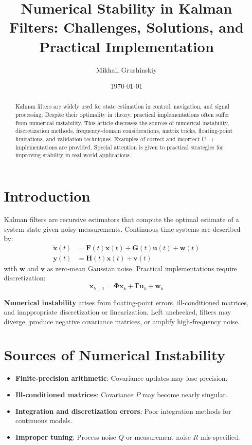 \documentclass[11pt]{article}
\title{Numerical Stability in Kalman Filters: Challenges, Solutions, and Practical Implementation}
\author{Mikhail Grushinskiy}
\date{\today}
\begin{document}
\maketitle

\begin{abstract}
Kalman filters are widely used for state estimation in control, navigation, and signal processing. Despite their optimality in theory, practical implementations often suffer from numerical instability. This article discusses the sources of numerical instability, discretization methods, frequency-domain considerations, matrix tricks, floating-point limitations, and validation techniques. Examples of correct and incorrect C++ implementations are provided. Special attention is given to practical strategies for improving stability in real-world applications.
\end{abstract}

\tableofcontents
\newpage

\section{Introduction}
Kalman filters are recursive estimators that compute the optimal estimate of a system state given noisy measurements. Continuous-time systems are described by:
\begin{align}
\dot{\bm{x}}(t) &= \bm{F}(t) \bm{x}(t) + \bm{G}(t) \bm{u}(t) + \bm{w}(t) \\
\bm{y}(t) &= \bm{H}(t) \bm{x}(t) + \bm{v}(t)
\end{align}
with $\bm{w}$ and $\bm{v}$ as zero-mean Gaussian noise. Practical implementations require discretization:
\[
\bm{x}_{k+1} = \bm{\Phi} \bm{x}_k + \bm{\Gamma} \bm{u}_k + \bm{w}_k
\]

\textbf{Numerical instability} arises from floating-point errors, ill-conditioned matrices, and inappropriate discretization or linearization. Left unchecked, filters may diverge, produce negative covariance matrices, or amplify high-frequency noise.

\section{Sources of Numerical Instability}
\begin{itemize}
    \item \textbf{Finite-precision arithmetic}: Covariance updates may lose precision.
    \item \textbf{Ill-conditioned matrices}: Covariance $P$ may become nearly singular.
    \item \textbf{Integration and discretization errors}: Poor integration methods for continuous models.
    \item \textbf{Improper tuning}: Process noise $Q$ or measurement noise $R$ mis-specified.
\end{itemize}
\end{document}
